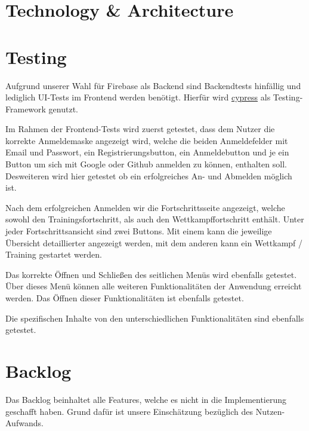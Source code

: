 \documentclass[a4paper]{article}
\theoremstyle{definition}
\begin{document}
\section{Technology \& Architecture}

\section{Testing}
Aufgrund unserer Wahl für Firebase als Backend sind Backendtests hinfällig und lediglich UI-Tests im Frontend werden benötigt. Hierfür wird \href{https://www.cypress.io/}{cypress} als Testing-Framework genutzt.

Im Rahmen der Frontend-Tests wird zuerst getestet, dass dem Nutzer die korrekte Anmeldemaske angezeigt wird, welche die beiden Anmeldefelder mit Email und Passwort, ein Registrierungsbutton, ein Anmeldebutton und je ein Button um sich mit Google oder Github anmelden zu können, enthalten soll. Desweiteren wird hier getestet ob ein erfolgreiches An- und Abmelden möglich ist.

Nach dem erfolgreichen Anmelden wir die Fortschrittsseite angezeigt, welche sowohl den Trainingsfortschritt, als auch den Wettkampffortschritt enthält. Unter jeder Fortschrittsansicht sind zwei Buttons. Mit einem kann die jeweilige Übersicht detaillierter angezeigt werden, mit dem anderen kann ein Wettkampf / Training gestartet werden.

Das korrekte Öffnen und Schließen des seitlichen Menüs wird ebenfalls getestet. Über dieses Menü können alle weiteren Funktionalitäten der Anwendung erreicht werden. Das Öffnen dieser Funktionalitäten ist ebenfalls getestet.

Die spezifischen Inhalte von den unterschiedlichen Funktionalitäten sind ebenfalls getestet.

\section{Backlog}
Das Backlog beinhaltet alle Features, welche es nicht in die Implementierung geschafft haben. Grund dafür ist
unsere Einschätzung bezüglich des Nutzen-Aufwands.
\end{document}
